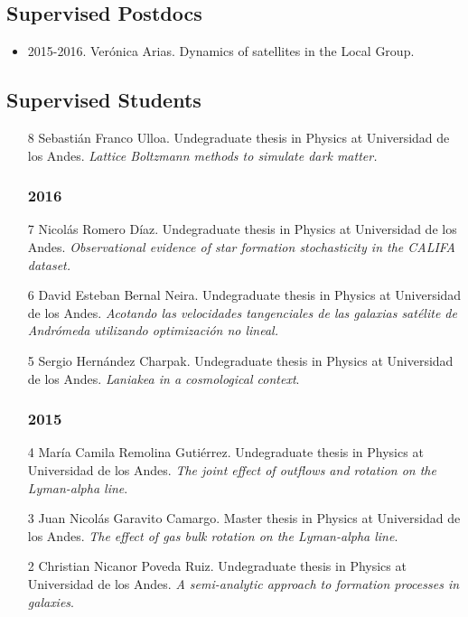 \documentclass[a4paper,10pt]{article} %
\begin{document}
\subsection{Supervised Postdocs}

\begin{itemize}
\item 2015-2016. Ver\'onica Arias. Dynamics of satellites in the
  Local Group.  
\end{itemize}

\subsection{Supervised Students}

\begin{itemize}
\subsubsection{2017}
\item[8] Sebasti\'an Franco Ulloa. 
  Undegraduate thesis in Physics at Universidad de los Andes. 
\emph{Lattice Boltzmann methods to simulate dark matter.}

\subsubsection{2016}
\item[7]
  Nicol\'as Romero D\'iaz.
  Undegraduate thesis in Physics at Universidad de los Andes. 
  \emph{Observational evidence of star formation stochasticity in the
    CALIFA dataset.}
\item[6] 
  David Esteban  Bernal Neira.
  Undegraduate thesis in Physics at Universidad de los Andes. 
  \emph{Acotando las velocidades tangenciales de las galaxias
    sat\'elite de Andr\'omeda utilizando optimizaci\'on no lineal.} 
\item[5] Sergio Hern\'andez Charpak. Undegraduate
  thesis in Physics at Universidad de los Andes. \emph{Laniakea in a cosmological context}. 
\subsubsection{2015}
\item[4] Mar\'ia Camila Remolina Guti\'errez. Undegraduate
  thesis in Physics at Universidad de los Andes. \emph{The joint
    effect of outflows and rotation on the Lyman-alpha line}. 
\item[3] Juan Nicol\'as Garavito Camargo. Master
  thesis in Physics at Universidad de los Andes. \emph{The effect of
    gas bulk rotation on the Lyman-alpha line}.
\item[2] Christian Nicanor Poveda Ruiz. Undegraduate thesis
  in Physics at Universidad de los Andes. \emph{A semi-analytic
    approach to formation processes in galaxies}. 

\end{itemize}
\end{document}
